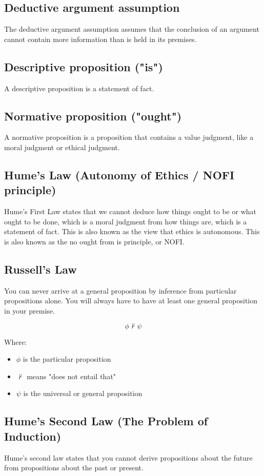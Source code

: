 \documentclass[11pt]{article}
\begin{document}
\subsection{Deductive argument assumption}
\label{sec:org981c51a}
The deductive argument assumption assumes that the conclusion of an argument cannot contain more information than is held in its premises.
\subsection{Descriptive proposition ("is")}
\label{sec:org831ea56}
A descriptive proposition is a statement of fact.
\subsection{Normative proposition ("ought")}
\label{sec:orge4f48e1}
A normative proposition is a proposition that contains a value judgment, like a moral judgment or ethical judgment.
\subsection{Hume's Law (Autonomy of Ethics / NOFI principle)}
\label{sec:orgdcfa47e}
Hume's First Law states that we cannot deduce how things ought to be or what ought to be done, which is a moral judgment from how things are, which is a statement of fact. This is also known as the view that ethics is autonomous. This is also known as the no ought from is principle, or NOFI.
\subsection{Russell's Law}
\label{sec:orge6f6b6a}
You can never arrive at a general proposition by inference from particular propositions alone. You will always have to have at least one general proposition in your premise.

\[\phi \nvdash \psi\]

Where:
\begin{itemize}
\item \(\phi\) is the particular proposition
\item \(\nvdash\) means "does not entail that"
\item \(\psi\) is the universal or general proposition
\end{itemize}
\subsection{Hume's Second Law (The Problem of Induction)}
\label{sec:orgf16652e}
Hume's second law states that you cannot derive propositions about the future from propositions about the past or present.
\end{document}
